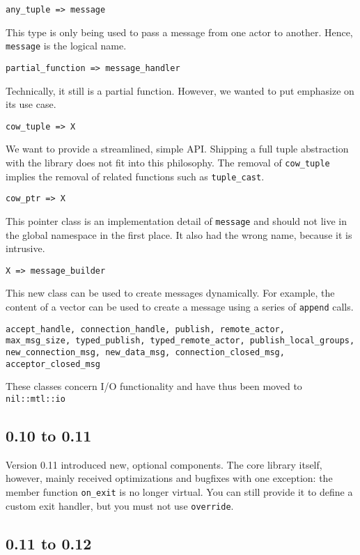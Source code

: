 \lstinline^any_tuple => message^

This type is only being used to pass a message from one actor to another.
Hence, \lstinline^message^ is the logical name.

\lstinline^partial_function => message_handler^

Technically, it still is a partial function. However, we wanted to put
emphasize on its use case.

\lstinline^cow_tuple => X^

We want to provide a streamlined, simple API. Shipping a full tuple abstraction
with the library does not fit into this philosophy. The removal of
\lstinline^cow_tuple^ implies the removal of related functions such as
\lstinline^tuple_cast^.

\lstinline^cow_ptr => X^

This pointer class is an implementation detail of \lstinline^message^ and
should not live in the global namespace in the first place. It also had the
wrong name, because it is intrusive.

\lstinline^X => message_builder^

This new class can be used to create messages dynamically. For example, the
content of a vector can be used to create a message using a series of
\lstinline^append^ calls.

\begin{lstlisting}
accept_handle, connection_handle, publish, remote_actor,
max_msg_size, typed_publish, typed_remote_actor, publish_local_groups,
new_connection_msg, new_data_msg, connection_closed_msg, acceptor_closed_msg
\end{lstlisting}

These classes concern I/O functionality and have thus been moved to
\lstinline^nil::mtl::io^

\subsection{0.10 to 0.11}

Version 0.11 introduced new, optional components. The core library itself,
however, mainly received optimizations and bugfixes with one exception: the
member function \lstinline^on_exit^ is no longer virtual. You can still provide
it to define a custom exit handler, but you must not use \lstinline^override^.

\subsection{0.11 to 0.12}

